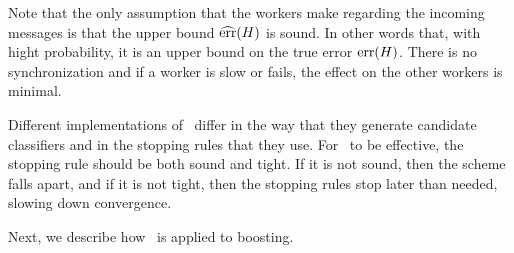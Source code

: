 Note that the only assumption that the workers make regarding the
incoming messages is that the upper bound $\widehat{\mbox{err}}(H)$ is sound. In
other words that, with hight probability, it is an upper bound on the
true error $\mbox{err}(H)$. There is no synchronization and if a worker is
slow or fails, the effect on the other workers is minimal.

Different implementations of \tmsn\ differ in the way that they
generate candidate classifiers and in the stopping rules that they
use. For \tmsn\ to be effective, the stopping rule should be both
sound and tight. If it is not sound, then the scheme falls apart, and
if it is not tight, then the stopping rules stop later than needed,
slowing down convergence.

Next, we describe how \tmsn\ is applied to boosting.
